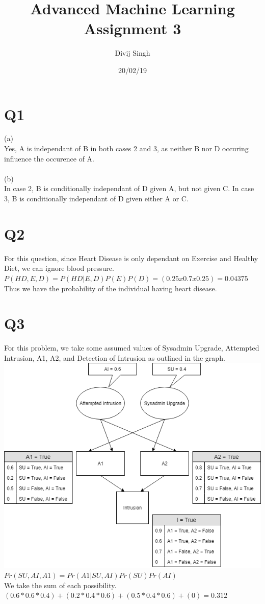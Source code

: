 \documentclass{article}
\title{Advanced Machine Learning Assignment 3}
\author{Divij Singh}
\date{20/02/19}
\begin{document}
	\maketitle
	
	\section{Q1}
(a)\\
Yes, A is independant of B in both cases 2 and 3, as neither B nor D occuring influence the occurence of A.\\\\
(b) \\
In case 2, B is conditionally independant of D given A, but not given C. In case 3, B is conditionally independant of D given either A or C.

\section{Q2}
For this question, since Heart Disease is only dependant on Exercise and Healthy Diet, we can ignore blood pressure.\\
$P(HD,E,D)= P(HD|E,D)P(E)P(D) = (0.25 x 0.7 x 0.25) = 0.04375$\\
Thus we have the probability of the individual having heart disease.

\section{Q3}
For this problem, we take some assumed values of Sysadmin Upgrade, Attempted Intrusion, A1, A2, and Detection of Intrusion as outlined in the graph.\\
\includegraphics[scale = 0.5]{Q3 Diagram.png}\\
$Pr(SU,AI,A1) = Pr(A1|SU,AI)Pr(SU)Pr(AI)$\\
We take the sum of each possibility.\\
$(0.6 * 0.6 * 0.4) + (0.2 * 0.4 * 0.6) + (0.5 * 0.4 * 0.6) + (0) = 0.312$\\\\
\end{document}
